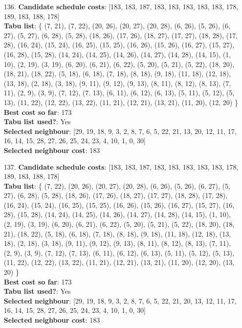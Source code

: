 \documentclass[fleqn]{article}
\begin{document}
\begin{itemize}
    \item[136.] \textbf{Candidate schedule costs}: [183, 183, 187, 183, 183, 183, 183, 183, 178, 189, 183, 188, 178] \\
    \textbf{Tabu list}: \{ (7, 21), (7, 22), (20, 26), (20, 27), (20, 28), (6, 26), (5, 26), (6, 27), (5, 27), (6, 28), (5, 28), (18, 26), (17, 26), (18, 27), (17, 27), (18, 28), (17, 28), (16, 24), (15, 24), (16, 25), (15, 25), (16, 26), (15, 26), (16, 27), (15, 27), (16, 28), (15, 28), (14, 24), (14, 25), (14, 26), (14, 27), (14, 28), (14, 15), (1, 10), (2, 19), (3, 19), (6, 20), (6, 21), (6, 22), (5, 20), (5, 21), (5, 22), (18, 20), (18, 21), (18, 22), (5, 18), (6, 18), (7, 18), (8, 18), (9, 18), (11, 18), (12, 18), (13, 18), (2, 18), (3, 18), (9, 11), (9, 12), (9, 13), (8, 11), (8, 12), (8, 13), (7, 11), (2, 9), (3, 9), (7, 12), (7, 13), (6, 11), (6, 12), (6, 13), (5, 11), (5, 12), (5, 13), (11, 22), (12, 22), (13, 22), (11, 21), (12, 21), (13, 21), (11, 20), (12, 20) \} \\
    \textbf{Best cost so far}: 173 \\
    \textbf{Tabu list used?}: Yes \\
    \textbf{Selected neighbour}: [29, 19, 18, 9, 3, 2, 8, 7, 6, 5, 22, 21, 13, 20, 12, 11, 17, 16, 14, 15, 28, 27, 26, 25, 24, 23, 4, 10, 1, 0, 30] \\
    \textbf{Selected neighbour cost}: 183
      

    \item[137.] \textbf{Candidate schedule costs}: [183, 183, 187, 183, 183, 183, 183, 183, 178, 189, 183, 188, 178] \\
    \textbf{Tabu list}: \{ (7, 22), (20, 26), (20, 27), (20, 28), (6, 26), (5, 26), (6, 27), (5, 27), (6, 28), (5, 28), (18, 26), (17, 26), (18, 27), (17, 27), (18, 28), (17, 28), (16, 24), (15, 24), (16, 25), (15, 25), (16, 26), (15, 26), (16, 27), (15, 27), (16, 28), (15, 28), (14, 24), (14, 25), (14, 26), (14, 27), (14, 28), (14, 15), (1, 10), (2, 19), (3, 19), (6, 20), (6, 21), (6, 22), (5, 20), (5, 21), (5, 22), (18, 20), (18, 21), (18, 22), (5, 18), (6, 18), (7, 18), (8, 18), (9, 18), (11, 18), (12, 18), (13, 18), (2, 18), (3, 18), (9, 11), (9, 12), (9, 13), (8, 11), (8, 12), (8, 13), (7, 11), (2, 9), (3, 9), (7, 12), (7, 13), (6, 11), (6, 12), (6, 13), (5, 11), (5, 12), (5, 13), (11, 22), (12, 22), (13, 22), (11, 21), (12, 21), (13, 21), (11, 20), (12, 20), (13, 20) \} \\
    \textbf{Best cost so far}: 173 \\
    \textbf{Tabu list used?}: Yes \\
    \textbf{Selected neighbour}: [29, 19, 18, 9, 3, 2, 8, 7, 6, 5, 22, 21, 20, 13, 12, 11, 17, 16, 14, 15, 28, 27, 26, 25, 24, 23, 4, 10, 1, 0, 30] \\
    \textbf{Selected neighbour cost}: 183
      


\end{itemize}
\end{document}
